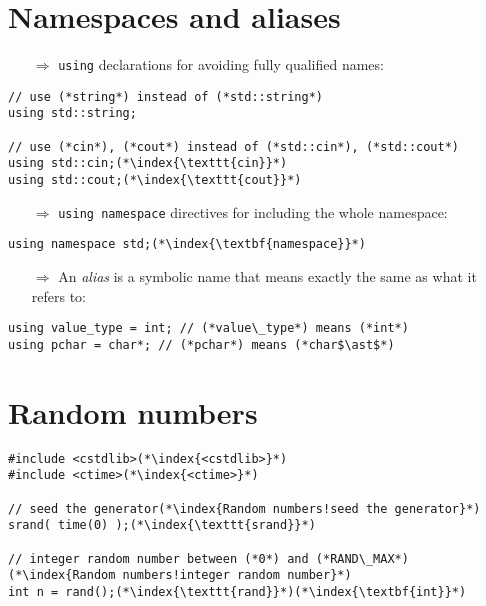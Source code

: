 \documentclass[10pt]{article}
\begin{document}
\section{Namespaces and aliases}
\small
\begin{enumerate}
\item[$\Rightarrow$] \texttt{using} declarations for avoiding fully qualified names:
\end{enumerate}
\begin{lstlisting}
// use (*string*) instead of (*std::string*)
using std::string;

// use (*cin*), (*cout*) instead of (*std::cin*), (*std::cout*)
using std::cin;(*\index{\texttt{cin}}*)
using std::cout;(*\index{\texttt{cout}}*)
\end{lstlisting}
\begin{enumerate}
\item[$\Rightarrow$] \texttt{using namespace} directives for including the whole namespace:
\end{enumerate}
\begin{lstlisting}
using namespace std;(*\index{\textbf{namespace}}*)
\end{lstlisting}
\begin{enumerate}
\item[$\Rightarrow$] An \emph{alias} is a symbolic name that means exactly the same as what it refers to:
\end{enumerate}
\begin{lstlisting}
using value_type = int; // (*value\_type*) means (*int*)
using pchar = char*; // (*pchar*) means (*char$\ast$*)    
\end{lstlisting}
%
%
\section{Random numbers}
\small
\begin{lstlisting}
#include <cstdlib>(*\index{<cstdlib>}*)
#include <ctime>(*\index{<ctime>}*)

// seed the generator(*\index{Random numbers!seed the generator}*)
srand( time(0) );(*\index{\texttt{srand}}*)

// integer random number between (*0*) and (*RAND\_MAX*) (*\index{Random numbers!integer random number}*)
int n = rand();(*\index{\texttt{rand}}*)(*\index{\textbf{int}}*)
\end{lstlisting}
%
%
\end{document}
